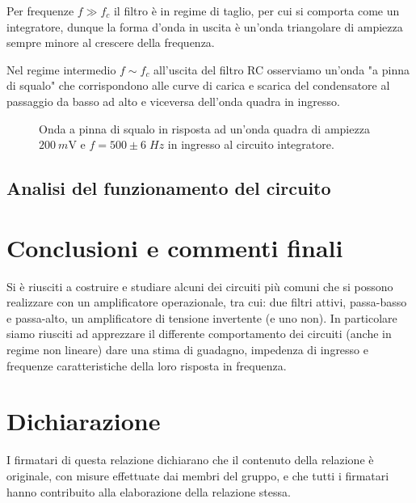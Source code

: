 \documentclass[10pt,a4paper]{article}
\begin{document}
Per frequenze $f \gg f_c$ il filtro è in regime di taglio, per cui si comporta
come un integratore, dunque la forma d'onda in uscita è un'onda triangolare di
ampiezza sempre minore al crescere della frequenza.

Nel regime intermedio $f \sim f_c$ all'uscita del filtro RC osserviamo un'onda
"a pinna di squalo" che corrispondono alle curve di carica e scarica del
condensatore al passaggio da basso ad alto e viceversa dell'onda quadra in
ingresso.
\begin{figure}[htbp]
\centering
\caption{Onda a pinna di squalo in risposta ad un'onda quadra di ampiezza
$\SI{200}{m\V}$ e $f = 500 \pm 6 \; \si{Hz}$ in ingresso al circuito
integratore. \label{fig: intfin}}
\end{figure}

\subsection{Analisi del funzionamento del circuito}

\section*{Conclusioni e commenti finali}
Si è riusciti a costruire e studiare alcuni dei circuiti più comuni che si
possono realizzare con un amplificatore operazionale, tra cui: due filtri
attivi, passa-basso e passa-alto, un amplificatore di tensione invertente
(e uno non).
In particolare siamo riusciti ad apprezzare il differente comportamento dei
circuiti (anche in regime non lineare) dare una stima di guadagno, impedenza di
ingresso e frequenze caratteristiche della loro risposta in frequenza.

\section*{Dichiarazione}
I firmatari di questa relazione dichiarano che il contenuto della relazione \`e
originale, con misure effettuate dai membri del gruppo, e che tutti i firmatari
hanno contribuito alla elaborazione della relazione stessa.
\end{document}
